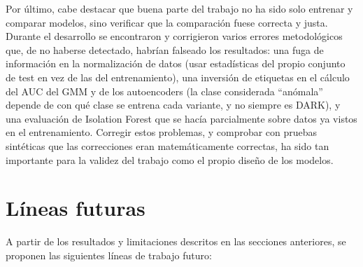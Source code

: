 Por último, cabe destacar que buena parte del trabajo no ha sido solo entrenar y comparar modelos, sino verificar que la comparación fuese correcta y justa. Durante el desarrollo se encontraron y corrigieron varios errores metodológicos que, de no haberse detectado, habrían falseado los resultados: una fuga de información en la normalización de datos (usar estadísticas del propio conjunto de test en vez de las del entrenamiento), una inversión de etiquetas en el cálculo del AUC del GMM y de los autoencoders (la clase considerada ``anómala'' depende de con qué clase se entrena cada variante, y no siempre es DARK), y una evaluación de Isolation Forest que se hacía parcialmente sobre datos ya vistos en el entrenamiento. Corregir estos problemas, y comprobar con pruebas sintéticas que las correcciones eran matemáticamente correctas, ha sido tan importante para la validez del trabajo como el propio diseño de los modelos.

\section{Líneas futuras}
\label{sec:lineas-futuras}

A partir de los resultados y limitaciones descritos en las secciones anteriores, se proponen las siguientes líneas de trabajo futuro:

